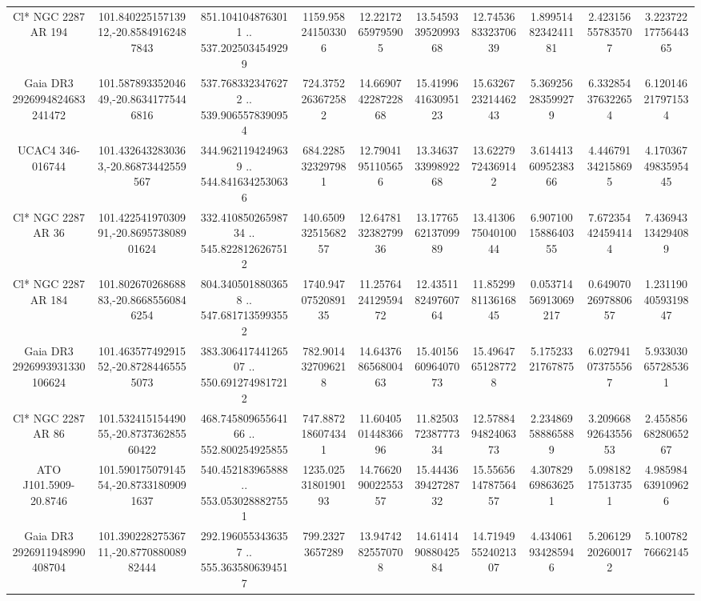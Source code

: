 \begin{table}
\begin{tabular}{cccccccccc}
Cl* NGC 2287     AR     194 & 101.84022515713912,-20.85849162487843 & 851.1041048763011 .. 537.2025034549299 & 1159.958241503306 & 12.22172659795905 & 13.545933952099368 & 12.745368332370639 & 1.8995148234241181 & 2.423156557835707 & 3.2237221775644365 \\
Gaia DR3 2926994824683241472 & 101.58789335204649,-20.86341775446816 & 537.7683323476272 .. 539.9065578390954 & 724.3752263672582 & 14.669074228722868 & 15.419964163095123 & 15.632672321446243 & 5.369256283599279 & 6.332854376322654 & 6.120146217971534 \\
UCAC4 346-016744 & 101.4326432830363,-20.86873442559567 & 344.9621194249639 .. 544.8416342530636 & 684.2285323297981 & 12.79041951105656 & 13.346373399892268 & 13.62279724369142 & 3.6144136095238366 & 4.446791342158695 & 4.1703674983595445 \\
Cl* NGC 2287     AR      36 & 101.42254197030991,-20.869573808901624 & 332.41085026598734 .. 545.8228126267512 & 140.65093251568257 & 12.647813238279936 & 13.177656213709989 & 13.413067504010044 & 6.9071001588640355 & 7.672354424594144 & 7.436943134294089 \\
Cl* NGC 2287     AR     184 & 101.80267026868883,-20.86685560846254 & 804.3405018803658 .. 547.6817135993552 & 1740.9470752089135 & 11.257642412959472 & 12.435118249760764 & 11.852998113616845 & 0.05371456913069217 & 0.6490702697880657 & 1.2311904059319847 \\
Gaia DR3 2926993931330106624 & 101.46357749291552,-20.87284465555073 & 383.30641744126507 .. 550.6912749817212 & 782.9014327096218 & 14.643768656800463 & 15.401566096407073 & 15.49647651287728 & 5.17523321767875 & 6.027941073755567 & 5.933030657285361 \\
Cl* NGC 2287     AR      86 & 101.53241515449055,-20.873736285560422 & 468.74580965564166 .. 552.800254925855 & 747.8872186074341 & 11.604050144836696 & 11.825037238777334 & 12.578849482406373 & 2.234869588865889 & 3.2096689264355653 & 2.4558566828065267 \\
ATO J101.5909-20.8746 & 101.59017507914554,-20.87331809091637 & 540.452183965888 .. 553.0530288827551 & 1235.0253180190193 & 14.766209002255357 & 15.444363942728732 & 15.556561478756457 & 4.307829698636251 & 5.098182175137351 & 4.985984639109626 \\
Gaia DR3 2926911948990408704 & 101.39022827536711,-20.877088008982444 & 292.1960553436357 .. 555.3635806394517 & 799.23273657289 & 13.94742825570708 & 14.614149088042584 & 14.719495524021307 & 4.434061934285946 & 5.206129202600172 & 5.10078276662145 \\

\end{tabular}
\end{table}
